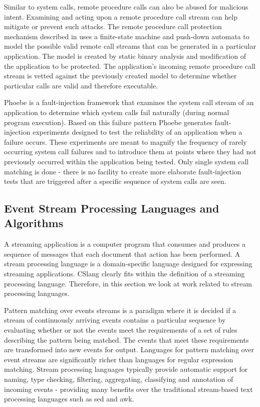 Similar to system calls, remote procedure calls can also be abused for malicious
intent. Examining and acting upon a remote procedure call stream can help
mitigate or prevent such attacks. The remote procedure call protection mechanism
described in \cite{DBLP:conf/uss/GiffinJM02} uses a finite-state machine and push-down automata
to model the possible valid remote call streams that can be generated in a
particular application. The model is created by static binary analysis
and modification of the application to be protected. The application's incoming
remote procedure call stream is vetted against the previously created model to
determine whether particular calls are valid and therefore
executable.

Phoebe\cite{DBLP:journals/corr/abs-2006-04444} is a fault-injection framework that examines
the system call stream of an application to determine which system calls fail
naturally (during normal program execution). Based on this failure pattern
Phoebe generates fault-injection experiments designed to test the reliability of
an application when a failure occurs. These experiments are meant to magnify the
frequency of rarely occurring system call failures and to introduce them at
points where they had not previously occurred within the application being
tested. Only single system call matching is done - there is no facility to create
more elaborate fault-injection tests that are triggered after a specific
sequence of system calls are seen.

\subsection{Event Stream Processing Languages and Algorithms}

A streaming application
is a computer program
that consumes and
produces
a sequence of messages that each document that action has been performed.
A stream processing language is a domain-specific language
designed for expressing streaming applications\cite{DBLP:journals/sigmod/HirzelBBVSV18}. CSlang clearly
fits within the definition of a streaming processing language.
Therefore, in this
section we look at work related to stream processing languages.

Pattern matching
over events streams is a paradigm
where it is decided if a stream of continuously arriving events
contains a particular sequence by evaluating whether or not
the events meet the requirements of a set of rules describing
the pattern being matched.
The events that meet these requirements are
transformed into new events for output.
Languages for pattern matching over event
streams are significantly richer than languages for regular expression
matching\cite{DBLP:conf/sigmod/AgrawalDGI08}. Stream processing languages typically provide automatic
support for naming, type checking, filtering, aggregating, classifying and
annotation of incoming events - providing many benefits over the traditional
stream-based text processing languages such as sed\cite{Mcmahon1979sed} and
awk\cite{DBLP:journals/spe/AhoKW79}.

